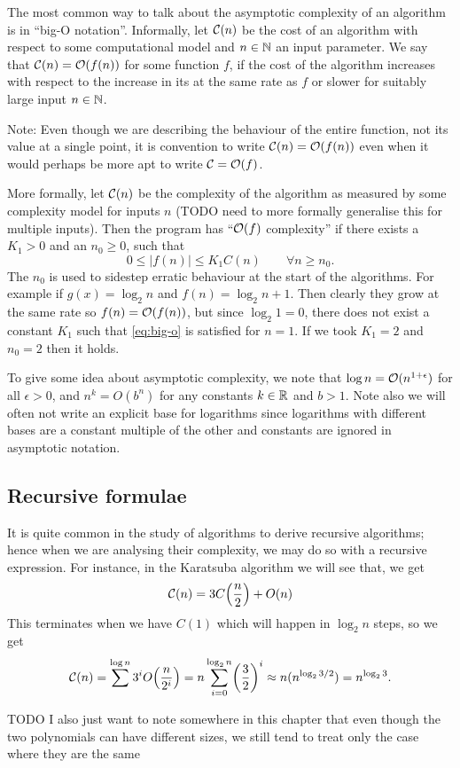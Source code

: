 The most common way to talk about the asymptotic complexity of an algorithm is in ``big-O notation''. Informally, let $\mathcal C(n)$ be the cost of an algorithm with respect to some computational model and $n \in {\mathbb N}$ an input parameter. We say that $\mathcal C(n) = \mathcal O(f(n))$ for some function $f$, if the cost of the algorithm increases with respect to the increase in its at the same rate as $f$ or slower for suitably large input $n \in {\mathbb N}$.

Note: Even though we are describing the behaviour of the entire function, not its value at a single point, it is convention to write $\mathcal C(n) = \mathcal O(f(n))$ even when it would perhaps be more apt to write $\mathcal C = \mathcal O(f)$.

More formally, let $\mathcal C(n)$ be the complexity of the algorithm as measured by some complexity model for inputs $n$ (TODO need to more formally generalise this for multiple inputs). Then the program has ``$\mathcal O(f)$ complexity'' if there exists a $K_1 > 0$  and an $n_0 \geq 0$, such that 
\begin{equation}\label{eq:big-o}
    0 \leq |f(n)| \leq K_1C(n) \qquad \forall n \geq n_0.
\end{equation}
The $n_0$ is used to sidestep erratic behaviour at the start of the algorithms. For example if $g(x) = \log_2 n$ and $f(n) = \log_2 n + 1$. Then clearly they grow at the same rate so $f(n) = \mathcal O(f(n))$, but since $\log_2 1 = 0$, there does not exist a constant $K_1$ such that \eqref{eq:big-o} is satisfied for $n = 1$. If we took $K_1 = 2$ and $n_0 = 2$ then it holds.

To give some idea about asymptotic complexity, we note that $\log n = \mathcal O(n^{1 + \epsilon})$ for all $\epsilon > 0$, and $n^k = O(b^n)$ for any constants $k \in {\mathbb R}$ and $b > 1$. Note also we will often not write an explicit base for logarithms since logarithms with different bases are a constant multiple of the other and constants are ignored in asymptotic notation. 

\subsection{Recursive formulae}%
\label{sub:Recursive forumulae}

It is quite common in the study of algorithms to derive recursive algorithms; hence when we are analysing their complexity, we may do so with a recursive expression. For instance, in the Karatsuba algorithm we will see that, we get
\[
    \M{C}(n) = 3C\bb{\frac{n}{2}} + O(n)
\]
This terminates when we have $C(1)$ which will happen in $\log_2 n$ steps, so we get
\[
    \M{C}(n) = \sum^{\log n} 3^i O\bb{\frac{n}{2^i}} = n\sum^{\log_2 n}_{i=0} \bb{\frac{3}{2}}^i \approx n(n^{\log_2 3/2}) = n^{\log_2 3}.
\]

TODO I also just want to note somewhere in this chapter that even though the two polynomials can have different sizes, we still tend to treat only the case where they are the same
